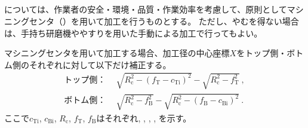 \clearpage
\subsection{\EndFaceInCChamferMilling}
\EndFaceInCChamfer については、作業者の安全・環境・品質・作業効率を考慮して、原則としてマシニングセンタ（\TaperEndMill）を用いて加工を行うものとする。
ただし、やむを得ない場合は、手持ち研磨機ややすりを用いた手動による加工で行ってもよい。

マシニングセンタを用いて加工する場合、加工径の中心座標$X$をトップ側・ボトム側のそれぞれに対して以下だけ補正する。
\begin{align*}
  \text{トップ側：}&~~
  \sqrt{R_\mathrm c^2-\left(f_\mathrm T-c_\mathrm{Ti}\right)^2}-\sqrt{R_\mathrm c^2-f_\mathrm T^2}\ ,\\
  \text{ボトム側：}&~~
  \sqrt{R_\mathrm c^2-f_\mathrm B^2}-\sqrt{R_\mathrm c^2-\left(f_\mathrm B-c_\mathrm{Bi}\right)^2}\ .
\end{align*}
ここで$c_\mathrm{Ti}$, $c_\mathrm{Bi}$, $R_\mathrm c$, $f_\mathrm T$, $f_\mathrm B$はそれぞれ\TopEndFaceInCChamferLength, \BottomEndFaceInCChamferLength, \CenterCurvatureRadius, \TopAlocationLength, \BottomAlocationLength を示す。



\clearpage


\subsection{\EndFaceRChamferMillingReferencePoint}


